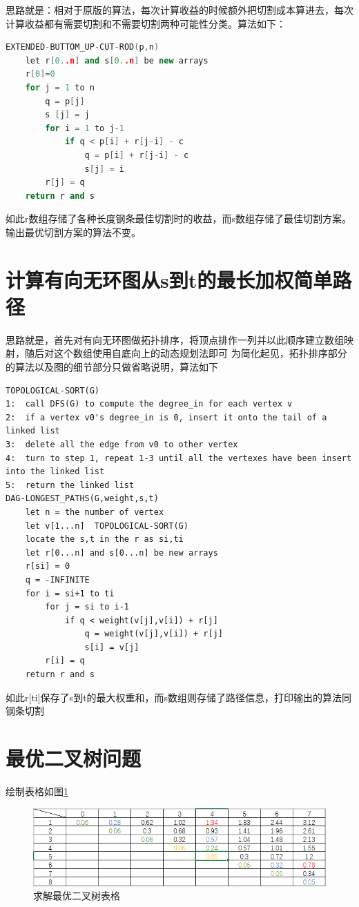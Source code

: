 \documentclass[cn,11pt,chinese]{elegantbook}
\begin{document}
思路就是：相对于原版的算法，每次计算收益的时候额外把切割成本算进去，每次计算收益都有需要切割和不需要切割两种可能性分类。算法如下：
\begin{lstlisting}[language = c++]
EXTENDED-BUTTOM_UP-CUT-ROD(p,n)
	let r[0..n] and s[0..n] be new arrays
	r[0]=0
	for j = 1 to n
		q = p[j]
		s [j] = j
		for i = 1 to j-1
			if q < p[i] + r[j-i] - c
				q = p[i] + r[j-i] - c
				s[j] = i
		r[j] = q
	return r and s
\end{lstlisting}
如此r数组存储了各种长度钢条最佳切割时的收益，而s数组存储了最佳切割方案。输出最优切割方案的算法不变。

\section{计算有向无环图从s到t的最长加权简单路径}

思路就是，首先对有向无环图做拓扑排序，将顶点排作一列并以此顺序建立数组映射，随后对这个数组使用自底向上的动态规划法即可
为简化起见，拓扑排序部分的算法以及图的细节部分只做省略说明，算法如下
\begin{lstlisting}
TOPOLOGICAL-SORT(G)
1:	call DFS(G) to compute the degree_in for each vertex v
2:	if a vertex v0's degree_in is 0, insert it onto the tail of a linked list
3:	delete all the edge from v0 to other vertex
4:	turn to step 1, repeat 1-3 until all the vertexes have been insert into the linked list
5:	return the linked list
DAG-LONGEST_PATHS(G,weight,s,t)
	let n = the number of vertex	
	let v[1...n]  TOPOLOGICAL-SORT(G)
	locate the s,t in the r as si,ti
	let r[0...n] and s[0...n] be new arrays
	r[si] = 0
	q = -INFINITE
	for i = si+1 to ti
		for j = si to i-1
			if q < weight(v[j],v[i]) + r[j]
				q = weight(v[j],v[i]) + r[j]
				s[i] = v[j]
		r[i] = q
	return r and s
\end{lstlisting}
如此r[ti]保存了s到t的最大权重和，而s数组则存储了路径信息，打印输出的算法同钢条切割

\section{最优二叉树问题}

绘制表格如图\ref{Ch6S3_list}
\begin{figure}[htbp]
	\centering
	\includegraphics[width=\textwidth]{image/Ch6S3_list.png}
	\caption{求解最优二叉树表格}
  \label{Ch6S3_list}
\end{figure}
\end{document}
